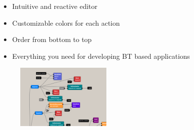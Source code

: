 \documentclass[notes,slidesec,a4]{seminar}
\begin{document}
\begin{hslide}
\newpage
{}
\begin{minipage}[t]{6.5cm}
  \vspace{0.5cm}
\begin{itemize}
\item Intuitive and reactive editor
\item Customizable colors for each action
\item Order from bottom to top
\item Everything you need for developing BT based applications
\end{itemize}
\end{minipage}
\begin{minipage}[t]{4.5cm}
	\begin{figure}
		\hspace{0.5cm}
		\includegraphics[width=4.6cm]{figs/screenshot2.png}
	\end{figure}
\end{minipage}

\end{hslide}
\end{document}
